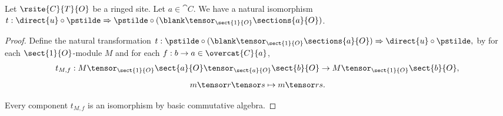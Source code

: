 \begin{lemma}
Let $\rsite{C}{T}{O}$ be a ringed site.
Let $a \in \cat{C}$.
We have a natural isomorphism 
$t:\direct{u} \circ \pstilde \Rightarrow \pstilde \circ (\blank \tensor_{\sect{1}{O}} \sections{a}{O})$.
\end{lemma}

\begin{proof}
Define the natural transformation
$t: \pstilde \circ (\blank \tensor_{\sect{1}{O}} \sections{a}{O}) \Rightarrow \direct{u} \circ \pstilde,$
by 
for each $\sect{1}{O}$-module $M$
and for each $f:b\rightarrow a\in \overcat{C}{a}$,
\[t_{M,f}: M \tensor_{\sect{1}{O}} \sect{a}{O} \tensor_{\sect{a}{O}} \sect{b}{O}  
	\rightarrow  M \tensor_{\sect{1}{O}} \sect{b}{O},\]
\[m\tensor r \tensor s \mapsto m \tensor rs.\]

Every component $t_{M,f}$ is an isomorphism by basic commutative algebra.
\end{proof}


